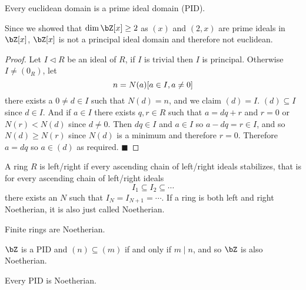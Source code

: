 \documentclass[10pt]{article}
\let\divides=\mid
\let\pideal=\triangleleft
\def\qed{\hskip1cm\hbox{}\hfill$\blacksquare$}
\begin{document}
\begin{prop*}

    Every euclidean domain is a prime ideal domain (PID).

\end{prop*}

Since we showed that $\dim\bZ[x]\geq2$ as $(x)$ and $(2,x)$ are prime ideals in $\bZ[x]$, $\bZ[x]$ is not a principal ideal domain and therefore not euclidean.

\begin{proof}

    Let $I\pideal R$ be an ideal of $R$, if $I$ is trivial then $I$ is principal.
    Otherwise $I\neq(0_R)$, let
    \[ n = \minof{N(a)}[a\in I, a\neq0] \]
    there exists a $0\neq d\in I$ such that $N(d)=n$, and we claim $(d)=I$.
    $(d)\subseteq I$ since $d\in I$.
    And if $a\in I$ there exists $q,r\in R$ such that $a=dq+r$ and $r=0$ or $N(r)<N(d)$ since $d\neq0$.
    Then $dq\in I$ and $a\in I$ so $a-dq=r\in I$, and so $N(d)\geq N(r)$ since $N(d)$ is a minimum and therefore $r=0$.
    Therefore $a=dq$ so $a\in(d)$ as required.
    \qed

\end{proof}

\begin{defn*}

    A ring $R$ is left/right  if every ascending chain of left/right ideals stabilizes, that is for every ascending chain of left/right ideals
    \[ I_1 \subseteq I_2 \subseteq \cdots \]
    there exists an $N$ such that $I_N=I_{N+1}=\cdots$.
    If a ring is both left and right Noetherian, it is also just called Noetherian.

\end{defn*}

\begin{exam*}

    \benum
        \item Finite rings are Noetherian.
        \item $\bZ$ is a PID and $(n)\subseteq(m)$ if and only if $m\divides n$, and so $\bZ$ is also Noetherian.
    \eenum

\end{exam*}

\begin{prop*}

    Every PID is Noetherian.

\end{prop*}
\end{document}
